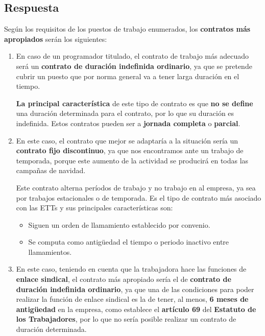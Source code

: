 \subsection{Respuesta}

Según los requisitos de los puestos de trabajo enumerados, los \textbf{contratos más apropiados} serán los siguientes:

\begin{enumerate}[label=(\alph*)]
    \item En caso de un programador titulado, el contrato de trabajo más adecuado será un \textbf{contrato de duración indefinida ordinario}, ya que se pretende cubrir un puesto que por norma general va a tener larga duración en el tiempo.

    \textbf{La principal característica} de este tipo de contrato es que \textbf{no se define} una duración determinada para el contrato, por lo que su duración es indefinida. Estos contratos pueden ser a \textbf{jornada completa} o \textbf{parcial}.

    \item En este caso, el contrato que mejor se adaptaría a la situación sería un \textbf{contrato fijo discontinuo}, ya que nos encontramos ante un trabajo de temporada, porque este aumento de la actividad se producirá en todas las campañas de navidad.

    Este contrato alterna períodos de trabajo y no trabajo en al empresa, ya sea por trabajos estacionales o de temporada. Es el tipo de contrato más asociado con las ETTs y sus principales características son:

    \begin{itemize}
        \item Siguen un orden de llamamiento establecido por convenio.
        \item Se computa como antigüedad el tiempo o periodo inactivo entre llamamientos.
    \end{itemize}

    \item En este caso, teniendo en cuenta que la trabajadora hace las funciones de \textbf{enlace sindical}, el contrato más apropiado sería el de \textbf{contrato de duración indefinida ordinario}, ya que una de las condiciones para poder realizar la función de enlace sindical es la de tener, al menos, \textbf{6 meses de antigüedad} en la empresa, como establece el \textbf{artículo 69} del \textbf{Estatuto de los Trabajadores}, por lo que no sería posible realizar un contrato de duración determinada.


\end{enumerate}
